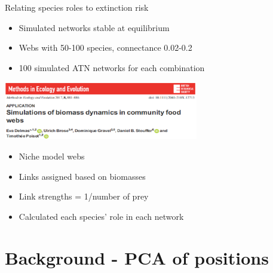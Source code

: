\documentclass{beamer}
\begin{document}
  \begin{frame}{Relating species roles to extinction risk}
      \begin{itemize}
        \item Simulated networks stable at equilibrium
        \item Webs with 50-100 species, connectance 0.02-0.2
        \item 100 simulated ATN networks for each combination
      \end{itemize}

      \begin{centering}

      \includegraphics[height=1in]{intro_figs/Delmas2017.eps}

      \end{centering}

      \begin{itemize}
        \item Niche model webs
        \item Links assigned based on biomasses
        \item Link strengths = 1/number of prey
      \end{itemize}

      \begin{itemize}
        \item Calculated each species' role in each network
      \end{itemize}

    \end{frame}

\section*{Background - PCA of positions}
\end{document}
